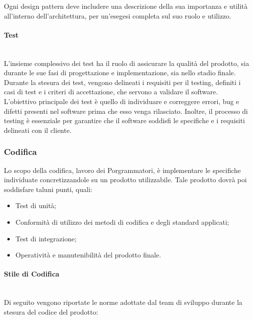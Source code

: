\documentclass[8pt]{article}
\newcommand{\subsubsubsection}[1]{\paragraph{#1}\mbox{}\\}
\begin{document}
Ogni design pattern deve includere una descrizione della sua importanza e utilità all'interno dell'architettura, per un'esegesi completa sul suo ruolo e utilizzo.
\clearpage
\subsubsubsection{Test}
L'insieme complessivo dei test ha il ruolo di assicurare la qualità del prodotto, sia durante le sue fasi di progettazione e implementazione, sia nello stadio finale.
Durante la stesura dei test, vengono delineati i requisiti per il testing, definiti i casi di test e i criteri di accettazione, che servono a validare il software. L'obiettivo
principale dei test è quello di individuare e correggere errori, bug e difetti presenti nel software prima che esso venga rilasciato.
Inoltre, il processo di testing è essenziale per garantire che il software soddisfi le specifiche e i requisiti delineati con il cliente.

\subsubsection{Codifica} \label{sec:codifica} 
Lo scopo della codifica, lavoro dei Porgrammatori, è implementare le specifiche individuate concretizzandole su un prodotto utilizzabile. Tale prodotto dovrà poi soddisfare taluni punti, quali:\\
\begin{itemize}
    \item Test di unità;
    \item Conformità di utilizzo dei metodi di codifica e degli standard applicati;
    \item Test di integrazione;
    \item Operatività e manutenibilità del prodotto finale.
\end{itemize}
\subsubsubsection{Stile di Codifica}
Di seguito vengono riportate le norme adottate dal team di sviluppo durante la stesura del codice del prodotto:
\end{document}
